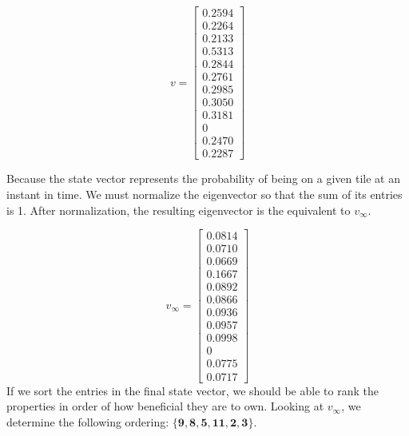 \documentclass[fleqn]{article}
\begin{document}
\begin{enumerate}[nolistsep]
\begin{enumerate}
			\begin{equation*}
				v = \begin{bmatrix}
					0.2594 \\ 
					0.2264 \\
					0.2133 \\
					0.5313 \\
					0.2844 \\
					0.2761 \\
					0.2985 \\
					0.3050 \\
					0.3181 \\
					0 \\
					0.2470\\
					0.2287
				\end{bmatrix}
			\end{equation*}
			
			Because the state vector represents the probability of being on a given tile at an instant in time. We must normalize the eigenvector so that the sum of its entries is 1. After normalization, the resulting eigenvector is the equivalent to $v_{\infty}$.
			
			 \begin{equation*}
			 	v_{\infty} = \begin{bmatrix}
			 		0.0814 \\
			 		0.0710 \\
			 		0.0669 \\
			 		0.1667 \\
			 		0.0892 \\
			 		0.0866 \\
			 		0.0936 \\
			 		0.0957 \\
			 		0.0998 \\
			 		0 \\
			 		0.0775 \\
			 		0.0717
			 	\end{bmatrix}
			 \end{equation*}			
			 If we sort the entries in the final state vector, we should be able to rank the properties in order of how beneficial they are to own. Looking at $v_{\infty}$, we determine the following ordering: $\mathbf{\{9, 8, 5, 11, 2, 3\}}.$
		\end{enumerate}
	\end{enumerate}
\end{document}
